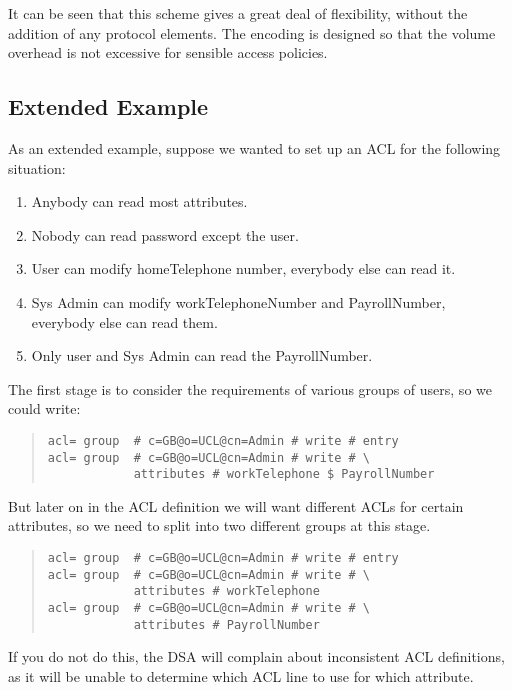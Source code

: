 It can be seen that this scheme gives a great deal of flexibility,
without the addition of any protocol elements.
The encoding is designed so that the volume overhead is not excessive
for sensible access policies.



\subsection {Extended Example}

As an extended example, suppose we wanted to set up an ACL for the 
following situation:

\begin{enumerate}
\item Anybody can read most attributes.
\item Nobody can read password except the user.
\item User can modify homeTelephone number, everybody else can read it.
\item Sys Admin can modify workTelephoneNumber and PayrollNumber, everybody
	else can read them.
\item Only user and Sys Admin can read the PayrollNumber.
\end{enumerate}

The first stage is to consider the requirements of various groups of
users, so we could write:

\begin{quote}\small\begin{verbatim}
acl= group  # c=GB@o=UCL@cn=Admin # write # entry
acl= group  # c=GB@o=UCL@cn=Admin # write # \
            attributes # workTelephone $ PayrollNumber
\end{verbatim}\end{quote}

But later on in the ACL definition we will want different ACLs for 
certain attributes, so we need to split into two different groups
at this stage.

\begin{quote}\small\begin{verbatim}
acl= group  # c=GB@o=UCL@cn=Admin # write # entry
acl= group  # c=GB@o=UCL@cn=Admin # write # \
            attributes # workTelephone
acl= group  # c=GB@o=UCL@cn=Admin # write # \
            attributes # PayrollNumber
\end{verbatim}\end{quote}

If you do not do this, the DSA will complain about inconsistent ACL
definitions, as it will be unable to determine which ACL line to use
for which attribute.

